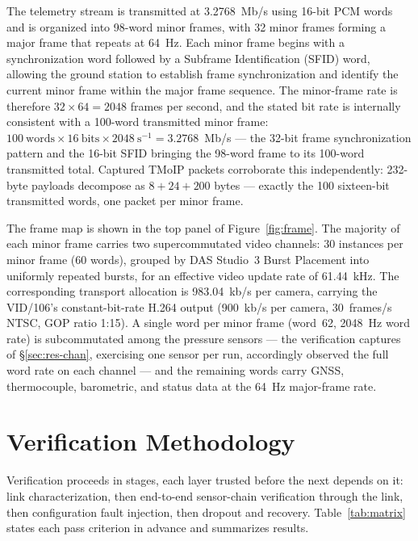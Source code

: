 \documentclass[12pt,letterpaper]{article}
\begin{document}
The telemetry stream is transmitted at 3.2768~Mb/s using 16-bit PCM words and
is organized into 98-word minor frames, with 32 minor frames forming a major
frame that repeats at 64~Hz. Each minor frame begins with a synchronization
word followed by a Subframe Identification (SFID) word, allowing the ground
station to establish frame synchronization and identify the current minor
frame within the major frame sequence. The minor-frame rate is therefore
\(32 \times 64 = 2048\) frames per second, and the stated bit rate is
internally consistent with a 100-word transmitted minor frame:
\(100~\text{words} \times 16~\text{bits} \times 2048~\text{s}^{-1} =
3.2768\)~Mb/s --- the 32-bit frame synchronization pattern and the 16-bit
SFID bringing the 98-word frame to its 100-word transmitted total. Captured TMoIP packets corroborate this independently: 232-byte payloads
decompose as $8 + 24 + 200$ bytes --- exactly the 100 sixteen-bit
transmitted words, one packet per minor frame.

The frame map is shown in the top panel of Figure~\ref{fig:frame}. The majority of each
minor frame carries two supercommutated video channels: 30 instances per minor frame (60 words), grouped by DAS
Studio~3 Burst Placement into uniformly repeated bursts, for an
effective video update rate of 61.44~kHz. The corresponding transport
allocation is 983.04~kb/s per camera, carrying the VID/106's
constant-bit-rate H.264 output (900~kb/s per camera, 30~frames/s NTSC,
GOP ratio 1:15). A single word per minor frame (word~62, 2048~Hz word
rate) is subcommutated among the pressure sensors --- the verification
captures of \S\ref{sec:res-chan}, exercising one sensor per run,
accordingly observed the full word rate on each channel --- and the
remaining words carry GNSS, thermocouple, barometric, and status data at
the 64~Hz major-frame rate.

\section{Verification Methodology}\label{sec:methodology}

Verification proceeds in stages, each layer trusted before the next
depends on it: link characterization, then end-to-end sensor-chain
verification through the link, then configuration fault injection, then
dropout and recovery. Table~\ref{tab:matrix} states each pass criterion in
advance and summarizes results.
\end{document}
